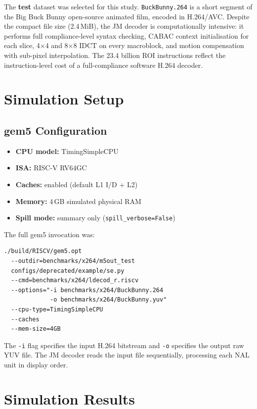 \documentclass[conference]{IEEEtran}
\begin{document}
The \textbf{test} dataset was selected for this study.
\texttt{BuckBunny.264} is a short segment of the Big Buck Bunny
open-source animated film, encoded in H.264/AVC. Despite the
compact file size (2.4\,MiB), the JM decoder is computationally
intensive: it performs full compliance-level syntax checking, CABAC
context initialisation for each slice, 4$\times$4 and 8$\times$8
IDCT on every macroblock, and motion compensation with sub-pixel
interpolation. The 23.4 billion ROI instructions reflect the
instruction-level cost of a full-compliance software H.264 decoder.

\section{Simulation Setup}

\subsection{gem5 Configuration}

\begin{itemize}
    \item \textbf{CPU model:}   TimingSimpleCPU
    \item \textbf{ISA:}         RISC-V RV64GC
    \item \textbf{Caches:}      enabled (default L1 I/D + L2)
    \item \textbf{Memory:}      4\,GB simulated physical RAM
    \item \textbf{Spill mode:}  summary only (\texttt{spill\_verbose=False})
\end{itemize}

The full gem5 invocation was:

\begin{verbatim}
./build/RISCV/gem5.opt
  --outdir=benchmarks/x264/m5out_test
  configs/deprecated/example/se.py
  --cmd=benchmarks/x264/ldecod_r.riscv
  --options="-i benchmarks/x264/BuckBunny.264
             -o benchmarks/x264/BuckBunny.yuv"
  --cpu-type=TimingSimpleCPU
  --caches
  --mem-size=4GB
\end{verbatim}

The \texttt{-i} flag specifies the input H.264 bitstream and
\texttt{-o} specifies the output raw YUV file. The JM decoder
reads the input file sequentially, processing each NAL unit in
display order.

\section{Simulation Results}
\end{document}
